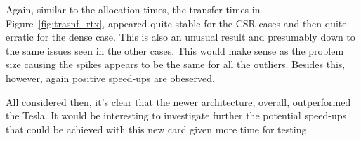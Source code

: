 Again, similar to the allocation times, the transfer times in Figure~\ref{fig:trasnf_rtx}, appeared quite stable for the CSR cases and then quite erratic for the dense case. This is also an unusual result and presumably down to the same issues seen in the other cases. This would make sense as the problem size causing the spikes appears to be the same for all the outliers. Besides this, however, again positive speed-ups are obeserved.

All considered then, it's clear that the newer architecture, overall, outperformed the Tesla. It would be interesting to investigate further the potential speed-ups that could be achieved with this new card given more time for testing.
